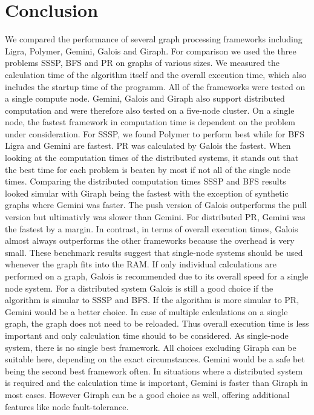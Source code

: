 
\section{Conclusion}

We compared the performance of several graph processing frameworks including Ligra, Polymer, Gemini, Galois and Giraph. 
For comparison we used the three problems SSSP, BFS and PR on graphs of various sizes.
We measured the calculation time of the algorithm itself and the overall execution time, which also includes the startup time of the programm.
All of the frameworks were tested on a single compute node. Gemini, Galois and Giraph also support distributed computation and were therefore also tested on a five-node cluster.
On a single node, the fastest framework in computation time is dependent on the problem under consideration.
For SSSP, we found Polymer to perform best while for BFS Ligra and Gemini are fastest. PR was calculated by Galois the fastest.
When looking at the computation times of the distributed systems, it stands out that the best time for each problem is beaten by most if not all of the single node times.
Comparing the distributed computation times SSSP and BFS results looked simular with Giraph being the fastest with the exception of synthetic graphs where Gemini was faster. The push version of Galois outperforms the pull version but ultimativly was slower than Gemini. For distributed PR, Gemini was the fastest by a margin.
In contrast, in terms of overall execution times, Galois almost always outperforms the other frameworks because the overhead is very small.
These benchmark results suggest that single-node systems should be used whenever the graph fits into the RAM. 
If only individual calculations are performed on a graph, Galois is recommended due to its overall speed for a single node system. 
For a distributed system Galois is still a good choice if the algorithm is simular to SSSP and BFS. If the algorithm is more simular to PR, Gemini would be a better choice.
In case of multiple calculations on a single graph, the graph does not need to be reloaded. Thus overall execution time is less important and only calculation time should to be considered.
As single-node system, there is no single best framework. All choices excluding Giraph can be suitable here, depending on the exact circumstances. Gemini would be a safe bet being the second best framework often. 
In situations where a distributed system is required and the calculation time is important, Gemini is faster than Giraph in most cases.
However Giraph can be a good choice as well, offering additional features like node fault-tolerance.

